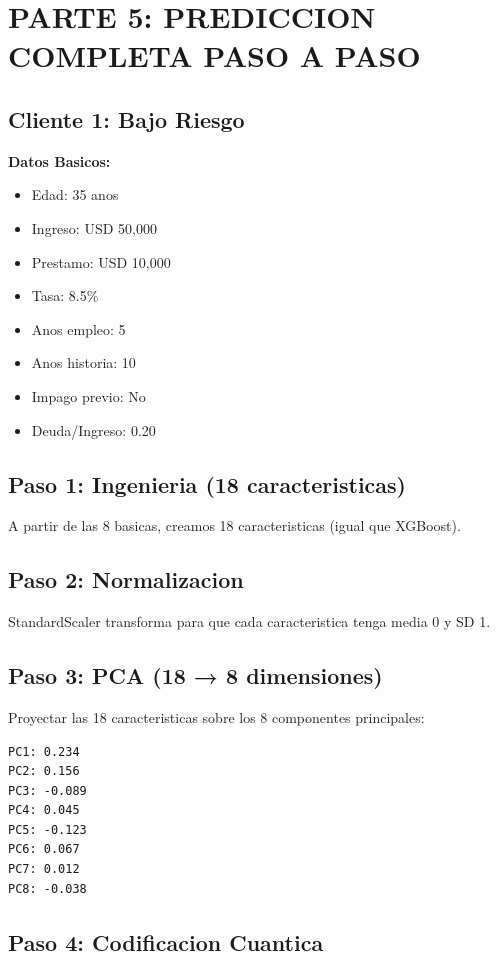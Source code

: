 \documentclass[11pt]{article}
\begin{document}
\section*{PARTE 5: PREDICCION COMPLETA PASO A PASO}

\subsection*{Cliente 1: Bajo Riesgo}

\textbf{Datos Basicos:}
\begin{itemize}
\item Edad: 35 anos
\item Ingreso: USD 50,000
\item Prestamo: USD 10,000
\item Tasa: 8.5\%
\item Anos empleo: 5
\item Anos historia: 10
\item Impago previo: No
\item Deuda/Ingreso: 0.20
\end{itemize}

\subsection*{Paso 1: Ingenieria (18 caracteristicas)}

A partir de las 8 basicas, creamos 18 caracteristicas (igual que XGBoost).

\subsection*{Paso 2: Normalizacion}

StandardScaler transforma para que cada caracteristica tenga media 0 y SD 1.

\subsection*{Paso 3: PCA (18 → 8 dimensiones)}

Proyectar las 18 caracteristicas sobre los 8 componentes principales:

\begin{verbatim}
PC1: 0.234
PC2: 0.156
PC3: -0.089
PC4: 0.045
PC5: -0.123
PC6: 0.067
PC7: 0.012
PC8: -0.038
\end{verbatim}

\subsection*{Paso 4: Codificacion Cuantica}
\end{document}
